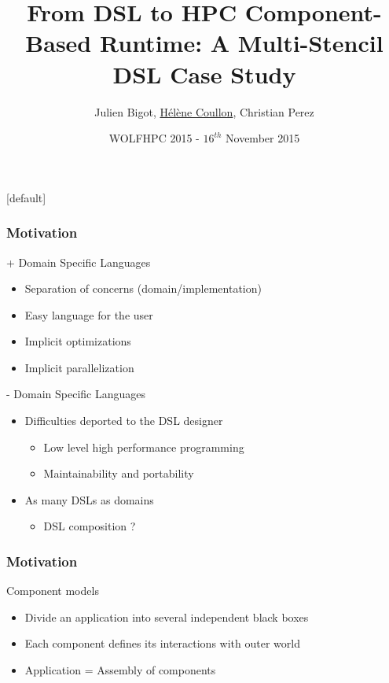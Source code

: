 \documentclass{beamer}
\title[From DSL to HPC Component-Based Runtime: A Multi-Stencil DSL Case Study]{From DSL to HPC Component-Based Runtime: A Multi-Stencil DSL Case Study}
\author[Julien Bigot (CEA), Hélène Coullon (INRIA), Christian Perez (INRIA)]{Julien Bigot, \underline{Hélène Coullon}, Christian Perez}
\institute[INRIA]{INRIA team Avalon\\Maison de la simulation (CEA)}
\date{WOLFHPC 2015 - $16^{th}$ November 2015}
\makeatletter
\newenvironment{withoutheadline}{
        \setbeamertemplate{headline}[default]
        \def\beamer@entrycode{\vspace*{-\headheight}}
    }{}
\makeatother
\begin{document}
\begin{withoutheadline}

\begin{frame}
    \titlepage
\end{frame}

\begin{frame}
\frametitle{Motivation} %
\begin{block}{+ Domain Specific Languages}
\begin{itemize}
\item Separation of concerns (domain/implementation)
\item Easy language for the user
\item Implicit optimizations
\item Implicit parallelization
\end{itemize}
\end{block}
\begin{alertblock}{- Domain Specific Languages}
\begin{itemize}
\item Difficulties deported to the DSL designer
\begin{itemize}
\item Low level high performance programming
\item Maintainability and portability
\end{itemize}
\item As many DSLs as domains
\begin{itemize}
\item DSL composition ?
\end{itemize}
\end{itemize}
\end{alertblock}
\end{frame}
\begin{frame}
\frametitle{Motivation} %
\begin{block}{Component models}
\begin{itemize}
\item Divide an application into several independent black boxes
\item Each component defines its interactions with outer world
\item Application = Assembly of components
\end{itemize}
\end{block}

\end{frame}
\end{withoutheadline}
\end{document}
